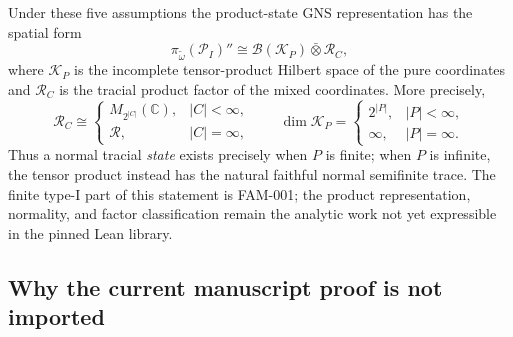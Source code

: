 \documentclass{article}
\newcommand{\cR}{\mathcal R}
\newcommand{\cB}{\mathcal B}
\begin{document}
Under these five assumptions the product-state GNS representation has the
spatial form
\begin{equation*}
  \pi_{\widetilde\omega}(\mathcal P_I)''
  \cong \cB(\mathcal K_P)\bar\otimes\cR_C,
\end{equation*}
where \(\mathcal K_P\) is the incomplete tensor-product Hilbert space of the pure
coordinates and \(\cR_C\) is the tracial product factor of the mixed
coordinates.  More precisely,
\begin{equation*}
  \cR_C\cong
  \begin{cases}
    M_{2^{\lvert C\rvert}}(\mathbb C),&\lvert C\rvert<\infty,\\
    \cR,&\lvert C\rvert=\infty,
  \end{cases}
  \qquad
  \dim\mathcal K_P=
  \begin{cases}
    2^{\lvert P\rvert},&\lvert P\rvert<\infty,\\
    \infty,&\lvert P\rvert=\infty.
  \end{cases}
\end{equation*}
Thus a normal tracial \emph{state} exists precisely when \(P\) is finite;
when \(P\) is infinite, the tensor product instead has the natural faithful
normal semifinite trace.  The finite type-I part of this statement is FAM-001;
the product representation, normality, and factor classification remain the
analytic work not yet expressible in the pinned Lean library.

\subsection*{Why the current manuscript proof is not imported}
\end{document}

